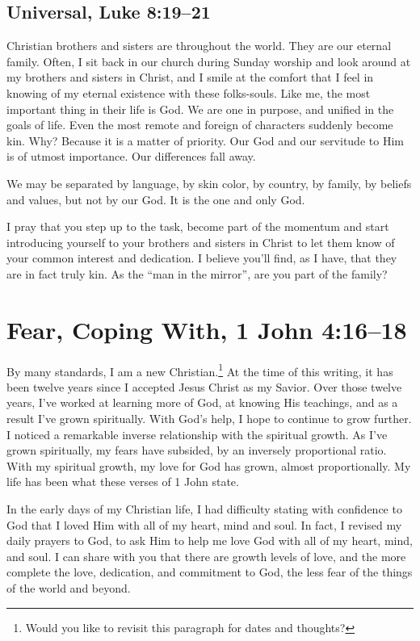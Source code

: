 \documentclass[12pt]{memoir}
\begin{document}
\subsection[Universal]{Universal, Luke 8:19--21}

Christian brothers and sisters are throughout the world. They are
our eternal family. Often, I sit back in our church during Sunday
worship and look around at my brothers and sisters in Christ, and I smile at the comfort that I feel in knowing of my eternal existence
with these folks-souls. Like me, the most important thing in their
life is God. We are one in purpose, and unified in the goals
of life. Even the most remote and foreign of characters suddenly become
kin. Why? Because it is a matter of priority. Our God and our servitude
to Him is of utmost importance. Our differences fall away. 

We may be separated by language, by skin color, by country, by family,
by beliefs and values, but not by our God. It is the one and only
God. 

I pray that you step up to the task, become part of the momentum and start introducing yourself to your brothers and sisters in Christ
to let them know of your common interest and dedication. I believe
you'll find, as I have, that they are in fact truly kin. As the ``man in the mirror'', are you part of the family?

\section[Fear, Coping With]{Fear, Coping With, 1 John 4:16--18}

By many standards, I am a new Christian.\footnote{Would you like to revisit this paragraph for dates and thoughts?}
At the time of this writing,
it has been twelve years since I accepted Jesus Christ as my Savior.
Over those twelve years, I've worked at learning more of God, at knowing
His teachings, and as a result I've grown spiritually. With God's
help, I hope to continue to grow further. I noticed a
remarkable inverse relationship with the spiritual growth.
As I've grown spiritually, my fears have subsided, by an inversely proportional ratio. With my spiritual growth, my love for God has
grown, almost proportionally. My life has been what these verses of
1 John state.

In the early days of my Christian life, I had difficulty stating with
confidence to God that I loved Him with all of my heart, mind and
soul. In fact, I revised my daily prayers to God, to ask Him to help
me love God with all of my heart, mind, and soul. I can share with
you that there are growth levels of love, and the more complete the
love, dedication, and commitment to God, the less fear of the things of the world and beyond. 
\end{document}
